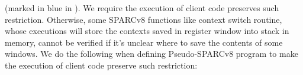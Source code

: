 (marked in blue in \Fig{\ref{fig:Abstraction of Register Windows and Memory}}). 
We require the execution of client code 
preserves such restriction. Otherwise, some SPARCv8 
functions like context switch routine, whose 
executions will store the contexts saved in 
register window into stack in memory, cannot be 
verified if it's unclear where to save the 
contents of some windows. 
We do the following when defining 
Pseudo-SPARCv8 program to make the execution 
of client code preserve such restriction:  
